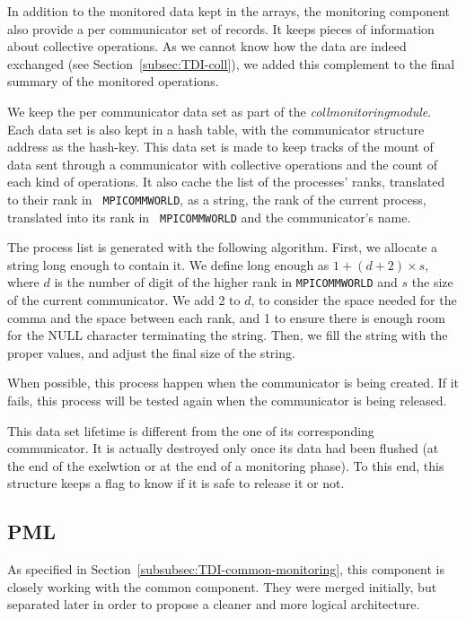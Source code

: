 In addition to the monitored data kept in the arrays, the monitoring
component also provide a per communicator set of records. It keeps
pieces of information about collective operations. As we cannot know
how the data are indeed exchanged (see Section~\ref{subsec:TDI-coll}),
we added this complement to the final summary of the monitored
operations.

We keep the per communicator data set as part of the {\it
  coll\brkunds{}monitoring\brkunds{}module}. Each data set is also
kept in a hash table, with the communicator structure address as the
hash-key. This data set is made to keep tracks of the mount of data
sent through a communicator with collective operations and the count
of each kind of operations. It also cache the list of the processes'
ranks, translated to their rank in {\tt
  MPI\brkunds{}COMM\brkunds{}WORLD}, as a string, the rank of the
current process, translated into its rank in {\tt
  MPI\brkunds{}COMM\brkunds{}WORLD} and the communicator's name.

The process list is generated with the following algorithm. First, we
allocate a string long enough to contain it. We define long enough as
$1 + (d + 2) \times s$, where $d$ is the number of digit of the higher
rank in {\tt MPI\brkunds{}COMM\brkunds{}WORLD} and $s$ the size of the
current communicator. We add 2 to $d$, to consider the space needed
for the comma and the space between each rank, and 1 to ensure there
is enough room for the NULL character terminating the string. Then, we
fill the string with the proper values, and adjust the final size of
the string.

When possible, this process happen when the communicator is being
created. If it fails, this process will be tested again when the
communicator is being released.

This data set lifetime is different from the one of its corresponding
communicator. It is actually destroyed only once its data had been
flushed (at the end of the exelwtion or at the end of a monitoring
phase). To this end, this structure keeps a flag to know if it is safe
to release it or not.

\subsection{PML}
\label{subsec:TDI-pml}

As specified in Section~\ref{subsubsec:TDI-common-monitoring}, this
component is closely working with the common component. They were
merged initially, but separated later in order to propose a cleaner
and more logical architecture.

